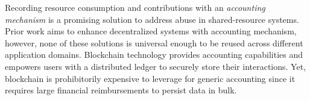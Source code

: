 Recording resource consumption and contributions with an \emph{accounting mechanism} is a promising solution to address abuse in shared-resource systems.
Prior work aims to enhance decentralized systems with accounting mechanism, however, none of these solutions is universal enough to be reused across different application domains.
Blockchain technology provides accounting capabilities and empowers users with a distributed ledger to securely store their interactions. %
Yet, blockchain is prohibitorily expensive to leverage for generic accounting since it requires large financial reimbursements to persist data in bulk.






